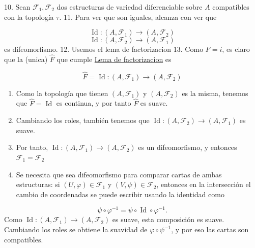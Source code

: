 \begin{bookproof}{}
10. Sean $\mathcal F_1,\mathcal F_2$ dos estructuras de variedad diferenciable sobre $A$ compatibles con la topología $\tau$. 11. Para ver que son iguales, alcanza con ver que

\[
\operatorname{Id}:(A,\mathcal F_1)\to (A,\mathcal F_2)
\]
\[
\operatorname{Id}:(A,\mathcal F_2)\to (A,\mathcal F_1)
\]
es difeomorfismo. 12. Usemos el lema de factorizacion 
 13. Como $F=i$, es claro que la (unica) $\widehat{F}$ que cumple \hyperref[blk:1258d0]{Lema de factorizacion} es

\[
\widehat F=\operatorname{Id}:(A,\mathcal F_1)\to(A,\mathcal F_2)
\]
\begin{enumerate}[start=14]
\item Como la topología que tienen $(A,\mathcal F_1)$ y $(A,\mathcal F_2)$ es la misma, tenemos que $\widehat F=\operatorname{Id}$ es continua, y por tanto $\widehat F$ es suave.
\item Cambiando los roles, también tenemos que $\operatorname{Id}:(A,\mathcal F_2)\to(A,\mathcal F_1)$ es suave.
\item Por tanto, $\operatorname{Id}:(A,\mathcal F_1)\to(A,\mathcal F_2)$ es un difeomorfismo, y entonces $\mathcal F_1=\mathcal F_2$
\item Se necesita que sea difeomorfismo para comparar cartas de ambas estructuras: si $(U,\varphi)\in\mathcal F_1$ y $(V,\psi)\in\mathcal F_2$, entonces en la intersección el cambio de coordenadas se puede escribir usando la identidad como
\end{enumerate}
\[
\psi\circ\varphi^{-1}=\psi\circ\operatorname{Id}\circ\varphi^{-1}.
\]
Como $\operatorname{Id}:(A,\mathcal F_1)\to(A,\mathcal F_2)$ es suave, esta composición es suave. Cambiando los roles se obtiene la suavidad de $\varphi\circ\psi^{-1}$, y por eso las cartas son compatibles.

\bookqed
\end{bookproof}
